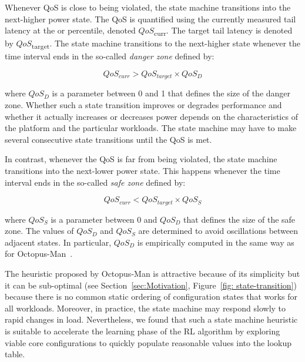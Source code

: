 Whenever QoS is close to being violated, the state machine transitions into the
next-higher power state. The QoS is quantified using the currently measured tail latency
at the \ninefive or \ninenine percentile, denoted $QoS$\textsubscript{curr}. The target tail latency
is denoted by $QoS$\textsubscript{target}. The state machine transitions to the
next-higher state whenever the time interval ends in the so-called \emph{danger zone}
defined by:

\begin{equation*}
\label{eq:Death-zone}
QoS_{\mathit{curr}} > QoS_{\mathit{target}} \times QoS_{\mathit{D}}
\end{equation*}



where $QoS_\mathit{D}$ is a parameter between 0 and 1 that defines the size of the danger
zone. Whether such a state transition improves or degrades performance and whether it
actually increases or decreases power depends on the characteristics of the platform and
the particular workloads. The state machine may have to make several consecutive state
transitions until the QoS is met.

In contrast, whenever the QoS is far from being violated, the state machine transitions
into the next-lower power state. This happens whenever the time interval ends in the
so-called \emph{safe zone} defined by:

\begin{equation*}
\label{eq:Safe-zone}
QoS_{\mathit{curr}} < QoS_{\mathit{target}} \times QoS_{\mathit{S}}
\end{equation*}

where $QoS_\mathit{S}$ is a parameter between 0 and $QoS_\mathit{D}$ that defines the size
of the safe zone. The values of $QoS_\mathit{D}$ and $QoS_\mathit{S}$ are determined to
avoid oscillations between adjacent states.  In particular, $QoS_\mathit{D}$ is
empirically computed in the same way as for
Octopus-Man~\citep{Petrucci2015Octopus-Man:Computers,Horvath2007DynamicControl}.

The heuristic proposed by Octopus-Man is attractive because of its simplicity but it can
be sub-optimal (see Section~\ref{sec:Motivation}, Figure~\ref{fig: state-transition})
because there is no common static ordering of configuration states that works for all
workloads. Moreover, in practice, the state machine may respond slowly to rapid changes in
load. Nevertheless, we found that such a state machine heuristic is suitable to accelerate
the learning phase of the RL algorithm by exploring viable core configurations to quickly
populate reasonable values into the lookup table.

